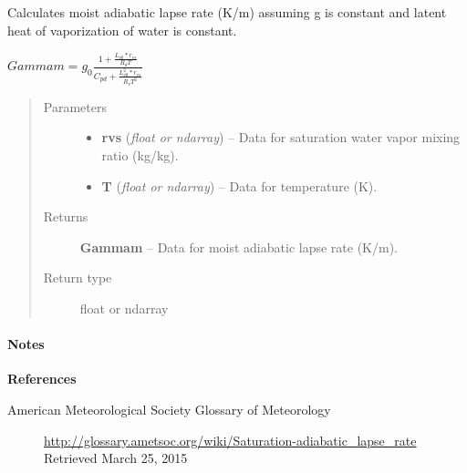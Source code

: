 \documentclass[letterpaper,10pt,english]{sphinxmanual}
\begin{document}

\begin{fulllineitems}
\label{atmos:atmos.equations.Gammam_from_rvs_T}
Calculates moist adiabatic lapse rate (K/m) assuming g is constant and latent
heat of vaporization of water is constant.

\(Gammam = g_0 \frac{1+\frac{L_{v0}*r_{vs}}{R_d
T}}{C_{pd}+\frac{L_{v0}^2*r_{vs}}{R_v T^2}}\)
\begin{quote}\begin{description}
\item[{Parameters}] \leavevmode\begin{itemize}
\item {} 
\textbf{rvs} (\emph{float or ndarray}) -- Data for saturation water vapor mixing ratio (kg/kg).

\item {} 
\textbf{T} (\emph{float or ndarray}) -- Data for temperature (K).

\end{itemize}

\item[{Returns}] \leavevmode
\textbf{Gammam} --
Data for moist adiabatic lapse rate (K/m).

\item[{Return type}] \leavevmode
float or ndarray

\end{description}\end{quote}
\paragraph{Notes}

\textbf{References}
\begin{description}
\item[{American Meteorological Society Glossary of Meteorology}] \leavevmode
\href{http://glossary.ametsoc.org/wiki/Saturation-adiabatic\_lapse\_rate}{http://glossary.ametsoc.org/wiki/Saturation-adiabatic\_lapse\_rate}
Retrieved March 25, 2015

\end{description}

\end{fulllineitems}

\end{document}
